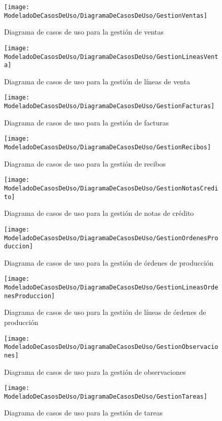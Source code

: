     \begin{figure}[H]
		\centering
		\texttt{[image: ModeladoDeCasosDeUso/DiagramaDeCasosDeUso/GestionVentas]}
		\caption{Diagrama de casos de uso para la gestión de ventas}
	\label{fig:GestionVentas}
    \end{figure}
    \begin{figure}[H]
		\centering
		\texttt{[image: ModeladoDeCasosDeUso/DiagramaDeCasosDeUso/GestionLineasVenta]}
		\caption{Diagrama de casos de uso para la gestión de líneas de venta}
	\label{fig:GestionLineasVenta}
    \end{figure}
    \begin{figure}[H]
		\centering
		\texttt{[image: ModeladoDeCasosDeUso/DiagramaDeCasosDeUso/GestionFacturas]}
		\caption{Diagrama de casos de uso para la gestión de facturas}
	\label{fig:GestionFacturas}
    \end{figure}
    \begin{figure}[H]
		\centering
		\texttt{[image: ModeladoDeCasosDeUso/DiagramaDeCasosDeUso/GestionRecibos]}
		\caption{Diagrama de casos de uso para la gestión de recibos}
	\label{fig:GestionRecibos}
    \end{figure}
    \begin{figure}[H]
		\centering
		\texttt{[image: ModeladoDeCasosDeUso/DiagramaDeCasosDeUso/GestionNotasCredito]}
		\caption{Diagrama de casos de uso para la gestión de notas de crédito}
	\label{fig:GestionNotasCredito}
    \end{figure}
    \begin{figure}[H]
		\centering
		\texttt{[image: ModeladoDeCasosDeUso/DiagramaDeCasosDeUso/GestionOrdenesProduccion]}
		\caption{Diagrama de casos de uso para la gestión de órdenes de producción}
	\label{fig:GestionOrdenesProduccion}
    \end{figure}
    \begin{figure}[H]
		\centering
		\texttt{[image: ModeladoDeCasosDeUso/DiagramaDeCasosDeUso/GestionLineasOrdenesProduccion]}
		\caption{Diagrama de casos de uso para la gestión de líneas de órdenes de producción}
	\label{fig:GestionLineasOrdenesProduccion}
    \end{figure}
    \begin{figure}[H]
		\centering
		\texttt{[image: ModeladoDeCasosDeUso/DiagramaDeCasosDeUso/GestionObservaciones]}
		\caption{Diagrama de casos de uso para la gestión de observaciones}
	\label{fig:GestionObservaciones}
	\end{figure}
	\begin{figure}[H]
		\centering
		\texttt{[image: ModeladoDeCasosDeUso/DiagramaDeCasosDeUso/GestionTareas]}
		\caption{Diagrama de casos de uso para la gestión de tareas}
	\label{fig:GestionObservaciones}
	\end{figure}
	\clearpage %
